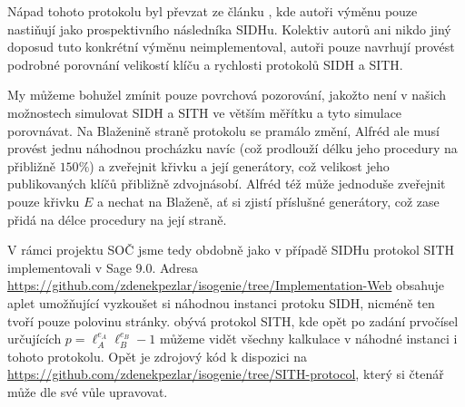\documentclass[12pt]{report}
\begin{document}
Nápad tohoto protokolu byl převzat ze článku \cite{Dark}, kde autoři výměnu pouze nastiňují jako prospektivního následníka SIDHu. Kolektiv autorů ani nikdo jiný doposud tuto konkrétní výměnu neimplementoval, autoři pouze navrhují provést podrobné porovnání velikostí klíču a rychlosti protokolů SIDH a SITH.

My můžeme bohužel zmínit pouze povrchová pozorování, jakožto není v našich možnostech simulovat SIDH a SITH ve větším měřítku a tyto simulace porovnávat. Na Blaženině straně protokolu se pramálo změní, Alfréd ale musí provést jednu náhodnou procházku navíc (což prodlouží délku jeho procedury na přibližně $150 \%$) a zveřejnit křivku a její generátory, což velikost jeho publikovaných klíčů přibližně zdvojnásobí. Alfréd též může jednoduše zveřejnit pouze křivku $E$ a nechat na Blaženě, ať si zjistí příslušné generátory, což zase přidá na délce procedury na její straně.

V rámci projektu SOČ jsme tedy obdobně jako v případě SIDHu protokol SITH implementovali v Sage 9.0. Adresa \url{https://github.com/zdenekpezlar/isogenie/tree/Implementation-Web} obsahuje aplet umožňující vyzkoušet si náhodnou instanci protoku SIDH, nicméně ten tvoří pouze polovinu stránky.  obývá protokol SITH, kde opět po zadání prvočísel určujících $p = \ell_A ^{e_A} \ell_B ^{e_B} - 1$ můžeme vidět všechny kalkulace v náhodné instanci i tohoto protokolu. Opět je zdrojový kód k dispozici na \url{https://github.com/zdenekpezlar/isogenie/tree/SITH-protocol}, který si čtenář může dle své vůle upravovat.
\end{document}
